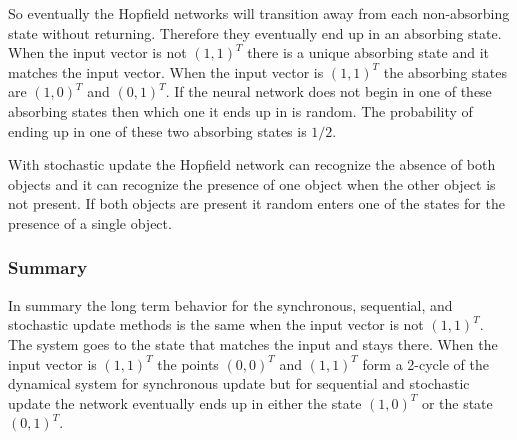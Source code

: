    So eventually the Hopfield networks will transition away from each 
non-absorbing state without returning.  Therefore they eventually end up in an 
absorbing state.  When the input vector is not $(1,1)^T$ there is a unique 
absorbing state and it matches the input vector.  When the input vector is 
$(1,1)^T$ the absorbing states are $(1,0)^T$ and $(0,1)^T$.  If the neural 
network does not begin in one of these absorbing states then which one it ends 
up in is random.  The probability of ending up in one of these two absorbing 
states is $1/2$.

  With stochastic update the Hopfield network can recognize the absence of
both objects and it can recognize the presence of one object when the other
object is not present.  If both objects are present it random enters one of the
states for the presence of a single object.

\subsubsection{Summary}

   In summary the long term behavior for the synchronous, sequential, and 
stochastic update methods is the same when the input vector is not $(1,1)^T$.  
The system goes to the state that matches the input and stays there.  When the 
input vector is $(1,1)^T$ the points $(0,0)^T$ and $(1,1)^T$ form a 2-cycle of 
the dynamical system for synchronous update but for sequential and stochastic 
update the network eventually ends up in either the state $(1,0)^T$ or the 
state $(0,1)^T$.